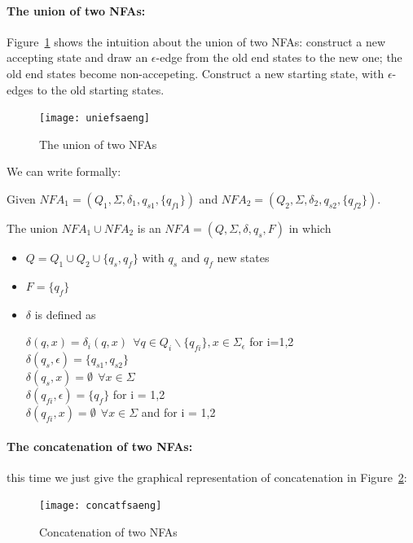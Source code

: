 \paragraph{The union of two NFAs:}


Figure~\ref{uniefsa} shows the intuition about the union of two NFAs:
construct a new accepting state and draw an $\epsilon$-edge from the
old end states to the new one; the old end states become
non-accepeting. Construct a new starting state, with $\epsilon$-edges
to the old starting states.


\begin{figure}[h]
\begin{center}\texttt{[image: uniefsaeng]}\end{center}
\caption{The union of two NFAs\label{uniefsa}}
\end{figure}

We can write formally:

Given $NFA_1 = (Q_1,\Sigma,\delta_1,q_{s1},\{q_{f1}\})$ and
%
$NFA_2 = (Q_2,\Sigma,\delta_2,q_{s2},\{q_{f2}\})$.

The union $NFA_1 \cup NFA_2$ is an $NFA = (Q,\Sigma,\delta,q_s,F)$
in which
\begin{itemize}
\item $Q = Q_1 \cup Q_2 \cup \{q_s,q_f\}$ with $q_s$ and $q_f$ new states
\item $F = \{q_f\}$
\item $\delta$ is defined as

 $\delta(q,x) = \delta_i(q,x)~~\forall q \in Q_i \backslash \{q_{fi}\}, x \in \Sigma_\epsilon$ for i=1,2 \\
 $\delta(q_s,\epsilon) = \{q_{s1}, q_{s2}\}$ \\
 $\delta(q_s,x) = \emptyset ~~\forall x \in \Sigma$ \\
 $\delta(q_{fi},\epsilon) = \{q_f\}$ for i = 1,2 \\
 $\delta(q_{fi}, x) = \emptyset ~~\forall x \in \Sigma$ and for i = 1,2
\end{itemize}


\paragraph{The concatenation of two NFAs:} this time we just give the
graphical representation of concatenation in Figure~\ref{concatfsa}:

\begin{figure}[h]
\begin{center}\texttt{[image: concatfsaeng]}\end{center}
\caption{Concatenation of two NFAs\label{concatfsa}}
\end{figure}

